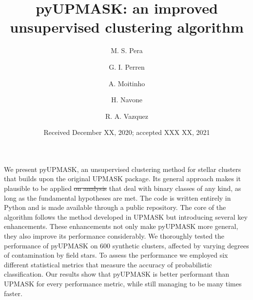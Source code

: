 \documentclass[draft]{aa}
\providecommand{\DIFaddtex}[1]{{\protect\color{blue}\uwave{#1}}} %
\providecommand{\DIFdeltex}[1]{{\protect\color{red}\sout{#1}}}                      %
\providecommand{\DIFaddbegin}{} %
\providecommand{\DIFaddend}{} %
\providecommand{\DIFdelbegin}{} %
\providecommand{\DIFdelend}{} %
\providecommand{\DIFadd}[1]{\texorpdfstring{\DIFaddtex{#1}}{#1}} %
\providecommand{\DIFdel}[1]{\texorpdfstring{\DIFdeltex{#1}}{}} %
\newcommand{\DIFscaledelfig}{0.5}
\newlength{\DIFdelgraphicswidth} %
\newlength{\DIFdelgraphicsheight} %
\newcommand{\DIFaddincludegraphics}[2][]{{\color{blue}\fbox{\DIFOincludegraphics[#1]{#2}}}} %
\newcommand{\DIFdelincludegraphics}[2][]{%
\sbox{\DIFdelgraphicsbox}{\DIFOincludegraphics[#1]{#2}}%
\settoboxwidth{\DIFdelgraphicswidth}{\DIFdelgraphicsbox} %
\settoboxtotalheight{\DIFdelgraphicsheight}{\DIFdelgraphicsbox} %
\scalebox{\DIFscaledelfig}{%
\parbox[b]{\DIFdelgraphicswidth}{\usebox{\DIFdelgraphicsbox}\\[-\baselineskip] \rule{\DIFdelgraphicswidth}{0em}}\llap{\resizebox{\DIFdelgraphicswidth}{\DIFdelgraphicsheight}{%
\setlength{\unitlength}{\DIFdelgraphicswidth}%
\begin{picture}(1,1)%
\thicklines\linethickness{2pt} %
{\color[rgb]{1,0,0}\put(0,0){\framebox(1,1){}}}%
{\color[rgb]{1,0,0}\put(0,0){\line( 1,1){1}}}%
{\color[rgb]{1,0,0}\put(0,1){\line(1,-1){1}}}%
\end{picture}%
}\hspace*{3pt}}} %
} %
\DeclareRobustCommand{\DIFaddbegin}{\DIFOaddbegin \let\includegraphics\DIFaddincludegraphics} %
\DeclareRobustCommand{\DIFaddend}{\DIFOaddend \let\includegraphics\DIFOincludegraphics} %
\DeclareRobustCommand{\DIFdelbegin}{\DIFOdelbegin \let\includegraphics\DIFdelincludegraphics} %
\DeclareRobustCommand{\DIFdelend}{\DIFOaddend \let\includegraphics\DIFOincludegraphics} %
\begin{document}
 


\title{pyUPMASK: an improved unsupervised clustering algorithm}

\author{M. S. Pera
\and
G. I. Perren
\and
A. Moitinho
\and
H. Navone
\and
R. A. Vazquez
}


\date{Received December XX, 2020; accepted XXX XX, 2021}

\abstract
  {}
  {We present pyUPMASK, an unsupervised clustering method for stellar clusters
  that builds upon the original UPMASK package. Its general approach makes it
  plausible to be applied \DIFdelbegin \DIFdel{on analysis }\DIFdelend \DIFaddbegin \DIFadd{to analyses }\DIFaddend that deal with binary classes of any kind,
  as long as the fundamental hypotheses are met.
  The code is written entirely in Python and is made available through a public
  repository.}
  {The core of the algorithm follows the method developed in UPMASK but
  introducing several key enhancements. These enhancements not only make
  pyUPMASK more general, they also improve its performance considerably.
  }
  {We thoroughly tested the performance of pyUPMASK on 600 synthetic clusters,
  affected by varying degrees of contamination by field stars. To assess the
  performance we employed six different statistical metrics that measure the
  accuracy of probabilistic classification.}
  {Our results show that pyUPMASK is better performant than UPMASK for every
  \DIFaddbegin \DIFadd{statistical }\DIFaddend performance metric, while still managing to be many times faster.
  }
\end{document}
